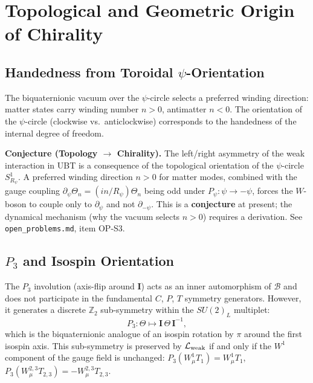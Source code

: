 \documentclass[12pt,a4paper]{article}
\theoremstyle{definition}
\theoremstyle{remark}
\begin{document}
\section{Topological and Geometric Origin of Chirality}
\label{sec:chir:topology}

\subsection{Handedness from Toroidal $\psi$-Orientation}

The biquaternionic vacuum over the $\psi$-circle selects a preferred winding
direction: matter states carry winding number $n>0$, antimatter $n<0$.
The orientation of the $\psi$-circle (clockwise vs.\ anticlockwise) corresponds
to the handedness of the internal degree of freedom.

\begin{insightbox}
\textbf{Conjecture (Topology $\to$ Chirality).}
The left/right asymmetry of the weak interaction in UBT is a consequence of
the topological orientation of the $\psi$-circle $S^1_{R_\psi}$.
A preferred winding direction $n>0$ for matter modes, combined with the
gauge coupling $\partial_\psi\Theta_n = (in/R_\psi)\Theta_n$ being odd under
$P_\psi:\psi\to-\psi$, forces the $W$-boson to couple only to $\partial_\psi$
and not $\partial_{-\psi}$.
This is a \textbf{conjecture} at present; the dynamical mechanism (why the
vacuum selects $n>0$) requires a derivation.
See \texttt{open\_problems.md}, item OP-S3.
\end{insightbox}

\subsection{$P_3$ and Isospin Orientation}

The $P_3$ involution (axis-flip around $\mathbf{I}$) acts as an inner automorphism
of $\mathcal{B}$ and does not participate in the fundamental $C$, $P$, $T$
symmetry generators.  However, it generates a discrete $\mathbb{Z}_2$ sub-symmetry
within the $SU(2)_L$ multiplet:
\begin{equation}
  P_3: \Theta \mapsto \mathbf{I}\,\Theta\,\mathbf{I}^{-1},
\end{equation}
which is the biquaternionic analogue of an isospin rotation by $\pi$ around
the first isospin axis.  This sub-symmetry is preserved by $\mathcal{L}_{\rm weak}$
if and only if the $W^1$ component of the gauge field is unchanged:
$P_3(W_\mu^1 T_1) = W_\mu^1 T_1$, $P_3(W_\mu^{2,3} T_{2,3}) = -W_\mu^{2,3}T_{2,3}$.

\ifdefined\INCLUDEMODE
\else
  
\end{document}
